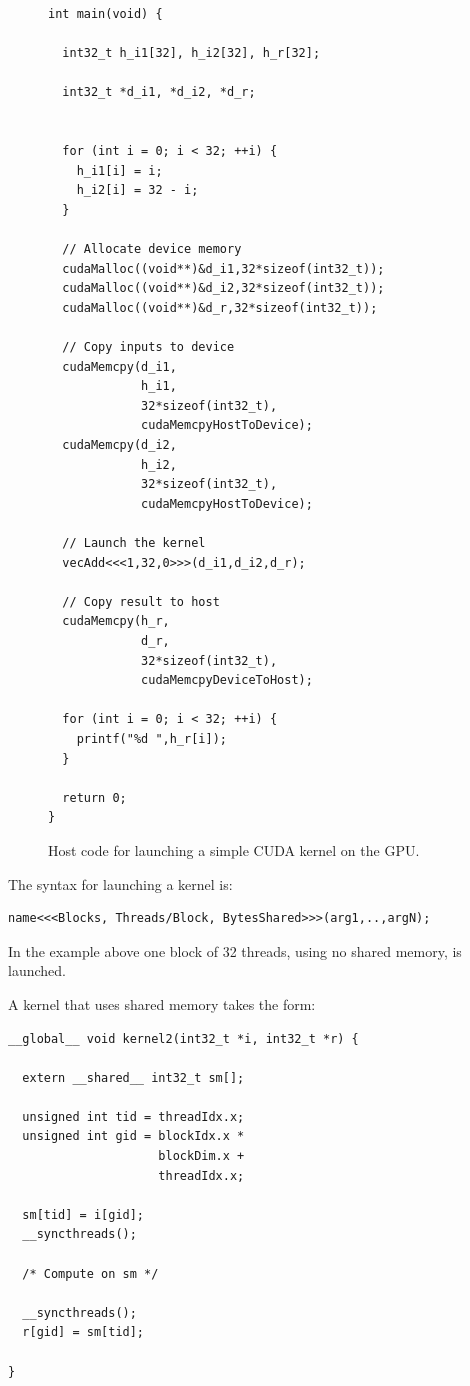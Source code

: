 \documentclass[a4paper]{book}
\begin{document}
\begin{figure} 
\begin{small}
\begin{Verbatim}[samepage=true]
int main(void) {
  
  int32_t h_i1[32], h_i2[32], h_r[32]; 

  int32_t *d_i1, *d_i2, *d_r;

  
  for (int i = 0; i < 32; ++i) { 
    h_i1[i] = i;
    h_i2[i] = 32 - i;
  }

  // Allocate device memory
  cudaMalloc((void**)&d_i1,32*sizeof(int32_t));
  cudaMalloc((void**)&d_i2,32*sizeof(int32_t));
  cudaMalloc((void**)&d_r,32*sizeof(int32_t));
  
  // Copy inputs to device
  cudaMemcpy(d_i1,
             h_i1,
             32*sizeof(int32_t),
             cudaMemcpyHostToDevice);
  cudaMemcpy(d_i2,
             h_i2,
             32*sizeof(int32_t),
             cudaMemcpyHostToDevice);
  
  // Launch the kernel
  vecAdd<<<1,32,0>>>(d_i1,d_i2,d_r); 

  // Copy result to host
  cudaMemcpy(h_r,
             d_r,
             32*sizeof(int32_t),
             cudaMemcpyDeviceToHost);

  for (int i = 0; i < 32; ++i) { 
    printf("%d ",h_r[i]);
  }

  return 0;
}
\end{Verbatim} 
\end{small}

\caption{Host code for launching a simple CUDA kernel on the GPU.}
\label{fig:CUDACODE1}

\end{figure} 

\pagebreak 

The syntax for launching a kernel is:

\begin{small}
\begin{Verbatim}[samepage=true]
name<<<Blocks, Threads/Block, BytesShared>>>(arg1,..,argN);
\end{Verbatim}
\end{small}

\noindent In the example above one block of 32 threads, using no shared memory, is launched. 

A kernel that uses shared memory takes the form: 

\begin{small}
\begin{Verbatim}[samepage=true]
__global__ void kernel2(int32_t *i, int32_t *r) {

  extern __shared__ int32_t sm[]; 

  unsigned int tid = threadIdx.x; 
  unsigned int gid = blockIdx.x * 
                     blockDim.x + 
                     threadIdx.x;

  sm[tid] = i[gid]; 
  __syncthreads();

  /* Compute on sm */ 
     
  __syncthreads();
  r[gid] = sm[tid]; 
  
}
\end{Verbatim} 
\end{small} 
\end{document}
